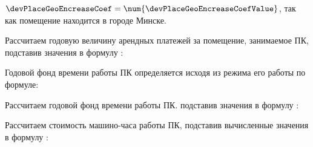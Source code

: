 \(\devPlaceGeoEncreaseCoef = \num{\devPlaceGeoEncreaseCoefValue}\), так как помещение находится в городе Минске.

Рассчитаем годовую величину арендных платежей за помещение, занимаемое ПК, подставив значения в формулу :
\devPlaceRentCostFormulaApplied

Годовой фонд времени работы ПК определяется исходя из режима его работы по формуле:
\pcWorkabilityFundEquation

Рассчитаем годовой фонд времени работы ПК. подставив значения в формулу :
\pcWorkabilityFundFormulaApplied

Рассчитаем стоимость машино-часа работы ПК, подставив вычисленные значения в формулу :
\pcHourCostFormulaApplied